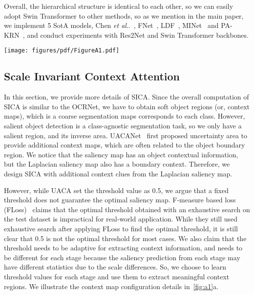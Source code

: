 \documentclass{llncs}
\makeatletter
\DeclareRobustCommand\onedot{\futurelet\@let@token\@onedot}
\def\@onedot{\ifx\@let@token.\else.\null\fi\xspace}
\def\etal{\emph{et al}\onedot}
\makeatother
\begin{document}
Overall, the hierarchical structure is identical to each other, so we can easily adopt Swin Transformer to other methods, so as we mention in the main paper, we implement 5 SotA models, Chen \etal~\cite{chen2018reverse}, FNet~\cite{wei2020f3net}, LDF~\cite{wei2020label}, MINet~\cite{pang2020multi} and PA-KRN~\cite{xu2021locate}, and conduct experiments with Res2Net and Swin Transformer backbones.

\begin{figure*}
    \centering
    \texttt{[image: figures/pdf/FigureA1.pdf]} 
    \caption{Context map configuration (a) and details of SICA (b).}
    \label{fig:a1}
\end{figure*} 
\subsection{Scale Invariant Context Attention}
In this section, we provide more details of SICA. Since the overall computation of SICA is similar to the OCRNet, we have to obtain soft object regions (or, context maps), which is a coarse segmentation maps corresponds to each class.
However, salient object detection is a class-agnostic segmentation task, so we only have a salient region, and its inverse area. 
UACANet~\cite{kim2021uacanet} first proposed uncertainty area to provide additional context maps, which are often related to the object boundary region.
We notice that the saliency map has an object contextual information, but the Laplacian saliency map also has a boundary context. 
Therefore, we design SICA with additional context clues from the Laplacian saliency map.

However, while UACA set the threshold value as 0.5, we argue that a fixed threshold does not guarantee the optimal saliency map. 
F-measure based loss (FLoss)~\cite{zhao2019optimizing} claims that the optimal threshold obtained with an exhaustive search on the test dataset is impractical for real-world application. 
While they still used exhaustive search after applying FLoss to find the optimal threshold, it is still clear that 0.5 is not the optimal threshold for most cases. 
We also claim that the threshold needs to be adaptive for extracting context information, 
and needs to be different for each stage because the saliency prediction from each stage may have different statistics due to the scale differences. 
So, we choose to learn threshold values for each stage and use them to extract meaningful context regions. 
We illustrate the context map configuration details in~\cref{fig:a1}a.
\end{document}
